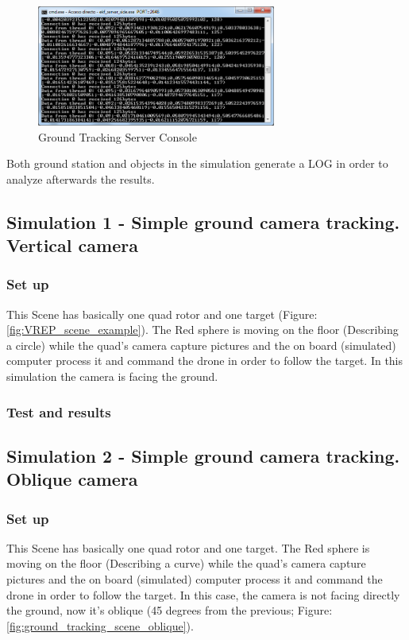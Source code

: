 \begin{figure}[h]
	\includegraphics[width=0.7\textwidth,natwidth=677,natheight=342]{../Images/c3/ground_tracking_server_console.png}
	\caption{Ground Tracking Server Console}
	\label{fig:Ground_Tracking_Server_Console}
\end{figure}

Both ground station and objects in the simulation generate a LOG in order to analyze afterwards the results.

\subsection{Simulation 1 - Simple ground camera tracking. Vertical camera}
\subsubsection{Set up}
This Scene has basically one quad rotor and one target (Figure: \ref{fig:VREP_scene_example}). The Red sphere is moving on the floor (Describing a circle) while the quad's camera capture pictures and the on board (simulated) computer process it and command the drone in order to follow the target. In this simulation the camera is facing the ground.

\subsubsection{Test and results}





\subsection{Simulation 2 - Simple ground camera tracking. Oblique camera}
\subsubsection{Set up}
This Scene has basically one quad rotor and one target. The Red sphere is moving on the floor (Describing a curve) while the quad's camera capture pictures and the on board (simulated) computer process it and command the drone in order to follow the target. In this case, the camera is not facing directly the ground, now it's oblique (45 degrees from the previous; Figure: \ref{fig:ground_tracking_scene_oblique}).

